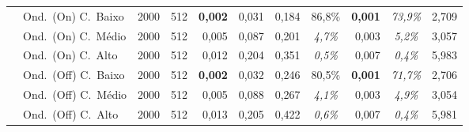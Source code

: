 \begin{landscape}
{\begin{longtable}{@{}llccrrrcrcr@{}}
   & Ond.\ (On) C.\ Baixo & 2000 & 512 & \textbf{0{,}002} & 0{,}031 & 0{,}184 & 86{,}8\% & \textbf{0{,}001} &  \textit{73{,}9\%} & 2{,}709 \\*
   & Ond.\ (On) C.\ Médio & 2000 & 512 & 0{,}005 & 0{,}087 & 0{,}201 & \textit{4{,}7\%} & 0{,}003 &  \textit{5{,}2\%} & 3{,}057 \\*
   & Ond.\ (On) C.\ Alto & 2000 & 512 & 0{,}012 & 0{,}204 & 0{,}351 & \textit{0{,}5\%} & 0{,}007 &  \textit{0{,}4\%} & 5{,}983 \\*
   & Ond.\ (Off) C.\ Baixo & 2000 & 512 & \textbf{0{,}002} & 0{,}032 & 0{,}246 & 80{,}5\% & \textbf{0{,}001} &  \textit{71{,}7\%} & 2{,}706 \\*
   & Ond.\ (Off) C.\ Médio & 2000 & 512 & 0{,}005 & 0{,}088 & 0{,}267 & \textit{4{,}1\%} & 0{,}003 &  \textit{4{,}9\%} & 3{,}054 \\*
   & Ond.\ (Off) C.\ Alto & 2000 & 512 & 0{,}013 & 0{,}205 & 0{,}422 & \textit{0{,}6\%} & 0{,}007 &  \textit{0{,}4\%} & 5{,}981 \\*
\end{longtable}
}
\end{landscape}

